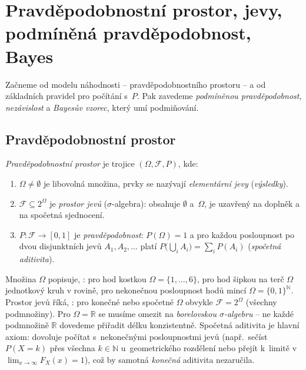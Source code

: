\documentclass[11pt,a4paper]{article}
\newcommand{\R}{\mathbb{R}}
\newcommand{\N}{\mathbb{N}}
\begin{document}
\section{Pravděpodobnostní prostor, jevy, podmíněná pravděpodobnost, Bayes}

Začneme od modelu náhodnosti -- pravděpodobnostního prostoru -- a od základních pravidel pro počítání s~$P$. Pak zavedeme \emph{podmíněnou pravděpodobnost}, \emph{nezávislost} a \emph{Bayesův vzorec}, který umí  podmiňování.

\subsection{Pravděpodobnostní prostor}

\begin{definice}
\emph{Pravděpodobnostní prostor} je trojice $(\Omega,\mathcal{F},P)$, kde:
\begin{enumerate}[label=(\arabic*)]
  \item $\Omega\ne\emptyset$ je libovolná množina, prvky se nazývají \emph{elementární jevy} (\emph{výsledky}).
  \item $\mathcal{F}\subseteq 2^{\Omega}$ je \emph{prostor jevů} ($\sigma$-algebra): obsahuje $\emptyset$ a~$\Omega$, je uzavřený na doplněk a na spočetná sjednocení.
  \item $P\colon\mathcal{F}\to[0,1]$ je \emph{pravděpodobnost}: $P(\Omega)=1$ a pro každou posloupnost po dvou disjunktních jevů $A_1,A_2,\dots$ platí $P\big(\bigcup_i A_i\big)=\sum_i P(A_i)$ (\emph{spočetná aditivita}).
\end{enumerate}
\end{definice}

\begin{intuice}
Množina $\Omega$ popisuje, : pro hod kostkou $\Omega=\{1,\dots,6\}$, pro hod šipkou na terč $\Omega$ jednotkový kruh v rovině, pro nekonečnou posloupnost hodů mincí $\Omega=\{0,1\}^{\N}$. Prostor jevů říká, : pro konečné nebo spočetné $\Omega$ obvykle $\mathcal{F}=2^{\Omega}$ (všechny podmnožiny). Pro $\Omega=\R$ se musíme omezit na \emph{borelovskou $\sigma$-algebru} -- ne každé podmnožině $\R$ dovedeme přiřadit délku konzistentně. Spočetná aditivita je hlavní axiom: dovoluje počítat s~nekonečnými posloupnostmi jevů (např.\ sečíst $P(X=k)$ přes všechna $k\in\N$ u~geometrického rozdělení nebo přejít k~limitě v~$\lim_{x\to\infty}F_X(x)=1$), což by samotná \emph{konečná} aditivita nezaručila.
\end{intuice}
\end{document}
